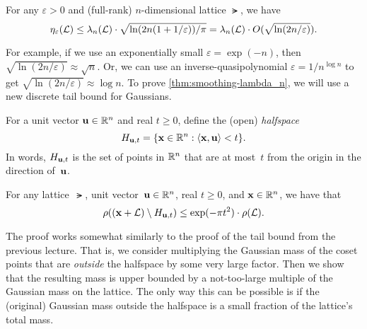 \documentclass[11pt]{article}
\begin{document}
\begin{theorem}
  \label{thm:smoothing-lambda_n}
  For any $\varepsilon > 0$ and (full-rank) $n$-dimensional lattice
  $\lat$, we have
  \[ \eta_\varepsilon(\mathcal{L}) \leq
    \lambda_n(\mathcal{L})\cdot\sqrt{\ln(2n(1+1/\varepsilon))/\pi}
    = \lambda_{n}(\mathcal{L}) \cdot O(\sqrt{\ln(2n/\varepsilon)}). \]
\end{theorem}

For example, if we use an exponentially small
$\varepsilon = \exp(-n)$, then
$\sqrt{\ln(2n/\varepsilon)} \approx \sqrt{n}$. Or, we can use an
inverse-quasipolynomial $\varepsilon = 1/n^{\log n}$ to get
$\sqrt{\ln(2n/\varepsilon)} \approx \log n$. To prove
\cref{thm:smoothing-lambda_n}, we will use a new discrete tail bound
for Gaussians.

\begin{definition}
  For a unit vector $\mathbf{u} \in \mathbb{R}^{n}$ and real $t \geq 0$, define the
  (open) \emph{halfspace}
  \[ H_{\mathbf{u},t} = \{\mathbf{x} \in \mathbb{R}^n : \langle\mathbf{x},\mathbf{u}\rangle < t\} . \]
  In words, $H_{\mathbf{u},t}$ is the set of points in $\mathbb{R}^{n}$ that are at
  most~$t$ from the origin in the direction of~$\mathbf{u}$.
\end{definition}

\begin{lemma}
  \label{lem:gaussian-halfspace}
  For any lattice~$\lat$, unit vector~$\mathbf{u} \in \mathbb{R}^{n}$, real
  $t \geq 0$, and $\mathbf{x} \in \mathbb{R}^n$, we have that
  \[ \rho((\mathbf{x}+\mathcal{L}) \setminus H_{\mathbf{u},t}) \leq \exp(-\pi t^2)
    \cdot \rho(\mathcal{L}) . \]
\end{lemma}

The proof works somewhat similarly to the proof of the tail bound from
the previous lecture. That is, we consider multiplying the Gaussian
mass of the coset points that are \emph{outside} the halfspace by some
very large factor. Then we show that the resulting mass is upper
bounded by a not-too-large multiple of the Gaussian mass on the
lattice. The only way this can be possible is if the (original)
Gaussian mass outside the halfspace is a small fraction of the
lattice's total mass.
\end{document}
